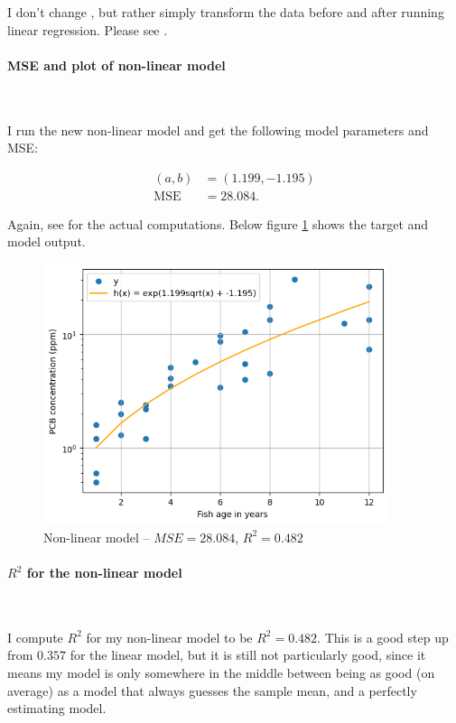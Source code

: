 I don't change , but rather simply transform the data
before and after running linear regression. Please see .

\paragraph{MSE and plot of non-linear model}~\smallskip

I run the new non-linear model and get the following model parameters and MSE:

\begin{align*}
  (a, b) &= (1.199, -1.195)\\
  \text{MSE} &= 28.084.
\end{align*}

Again, see  for the actual computations. Below figure
\ref{fig:3-5} shows the target and model output.

\begin{figure}[H]
\centering
  \includegraphics[width=0.9\textwidth]{figures/fig3_5.png}
\caption{Non-linear model -- $MSE = 28.084$, $R^2 = 0.482$}
\label{fig:3-5}
\end{figure}

\paragraph{$R^2$ for the non-linear model}~\smallskip

I compute $R^2$ for my non-linear model to be $R^2 = 0.482$. This is a good step
up from $0.357$ for the linear model, but it is still not particularly good,
since it means my model is only somewhere in the middle between being as good (on
average) as a model that always guesses the sample mean, and a perfectly estimating
model.

\sectend
